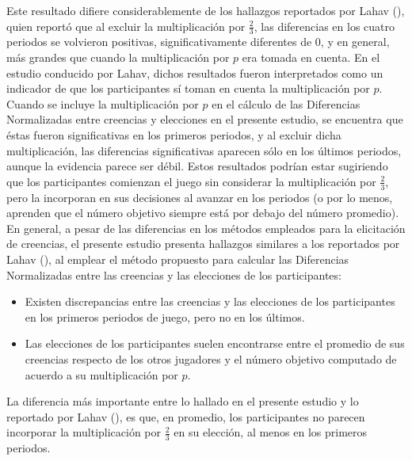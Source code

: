Este resultado difiere considerablemente de los hallazgos reportados por Lahav (\citeyear{Lahav}), quien reportó que al excluir la multiplicación por $\frac{2}{3}$, las diferencias en los cuatro periodos se volvieron positivas, significativamente diferentes de 0, y en general, más grandes que cuando la multiplicación por $p$ era tomada en cuenta. En el estudio conducido por Lahav, dichos resultados fueron interpretados como un indicador de que los participantes sí toman en cuenta la multiplicación por $p$.\\

Cuando se incluye la multiplicación por $p$ en el cálculo de las Diferencias Normalizadas entre creencias y elecciones en el presente estudio, se encuentra que éstas fueron significativas en los primeros periodos, y al excluir dicha multiplicación, las diferencias significativas aparecen sólo en los últimos periodos, aunque la evidencia parece ser débil. Estos resultados podrían estar sugiriendo que los participantes comienzan el juego sin considerar la multiplicación por $\frac{2}{3}$, pero la incorporan en sus decisiones al avanzar en los periodos (o por lo menos, aprenden que el número objetivo siempre está por debajo del número promedio).\\

En general, a pesar de las diferencias en los métodos empleados para la elicitación de creencias, el presente estudio presenta hallazgos similares a los reportados por Lahav (\citeyear{Lahav}), al emplear el método propuesto para calcular las Diferencias Normalizadas entre las creencias y las elecciones de los participantes:

\begin{itemize}
\item Existen discrepancias entre las creencias y las elecciones de los participantes en los primeros periodos de juego, pero no en los últimos.\\

\item Las elecciones de los participantes suelen encontrarse entre el promedio de sus creencias respecto de los otros jugadores y el número objetivo computado de acuerdo a su multiplicación por $p$.
\end{itemize}

La diferencia más importante entre lo hallado en el presente estudio y lo reportado por Lahav (\citeyear{Lahav}), es que, en promedio, los participantes no parecen incorporar la multiplicación por $\frac{2}{3}$ en su elección, al menos en los primeros periodos.\\

